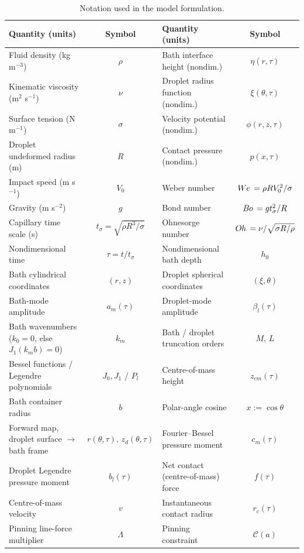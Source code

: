 \begin{table}
\centering
\caption{Notation used in the model formulation.}
\label{tab:notation}
\setlength{\tabcolsep}{1pt}
\small
\begin{tabular*}{\textwidth}{@{\extracolsep{\fill}}p{} c p{} c@{}}
\hline
Quantity (units) & Symbol & Quantity (units) & Symbol \\ \hline
Fluid density (kg m$^{-3}$) & $\rho$ & Bath interface height (nondim.) & $\eta(r,\tau)$ \\
Kinematic viscosity (m$^2$ s$^{-1}$) & $\nu$ & Droplet radius function (nondim.) & $\xi(\theta,\tau)$ \\
Surface tension (N m$^{-1}$) & $\sigma$ & Velocity potential (nondim.) & $\phi(r,z,\tau)$ \\
Droplet undeformed radius (m) & $R$ & Contact pressure (nondim.) & $p(x,\tau)$ \\
Impact speed (m s$^{-1}$) & $V_0$ & Weber number & $W\kern-0.03em e\,=\rho RV_0^2/\sigma$ \\
Gravity (m s$^{-2}$) & $g$ & Bond number & $B\kern-0.04em o\,=gt_\sigma^2/R$ \\
Capillary time scale (s) & $t_\sigma=\sqrt{\rho R^3/\sigma}$ & Ohnesorge number & $O\kern-0.04em h\,=\nu/\sqrt{\sigma R/\rho}$ \\
Nondimensional time & $\tau=t/t_\sigma$ & Nondimensional bath depth & $h_0$ \\
Bath cylindrical coordinates & $(r,z)$ & Droplet spherical coordinates & $(\xi,\theta)$ \\
Bath-mode amplitude & $a_m(\tau)$ & Droplet-mode amplitude & $\beta_l(\tau)$ \\
Bath wavenumbers ($k_0{=}0$, else $J_1(k_mb){=}0$) & $k_m$ & Bath / droplet truncation orders & $M$, $L$ \\
Bessel functions / Legendre polynomials & $J_0,J_1$ / $P_l$ & Centre-of-mass height & $z_{cm}(\tau)$ \\
Bath container radius & $b$ & Polar-angle cosine & $x:=\cos\theta$ \\
Forward map, droplet surface $\to$ bath frame & $r(\theta,\tau),\,z_d(\theta,\tau)$ & Fourier--Bessel pressure moment & $c_m(\tau)$ \\
Droplet Legendre pressure moment & $b_l(\tau)$ & Net contact (centre-of-mass) force & $f(\tau)$ \\
Centre-of-mass velocity & $v$ & Instantaneous contact radius & $r_c(\tau)$ \\
Pinning line-force multiplier & $\Lambda$ & Pinning constraint & $\mathcal C(a)$ \\

\end{tabular*}
\end{table}
